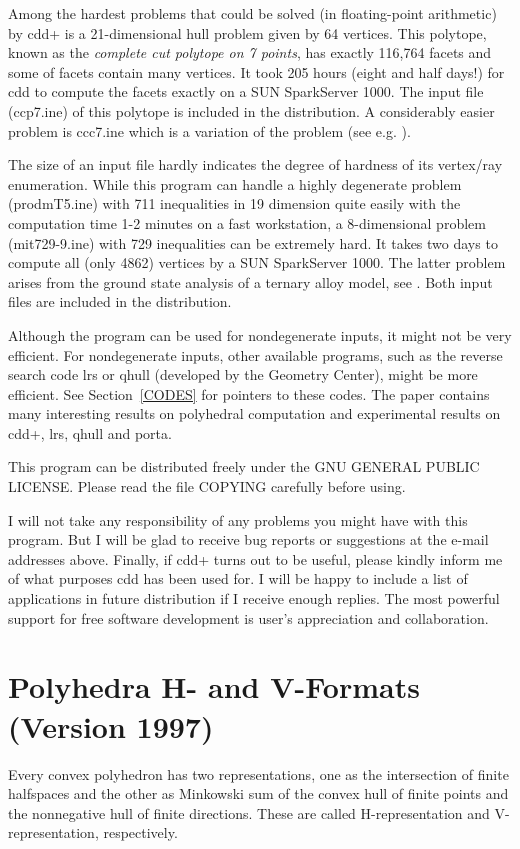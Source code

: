 \documentclass[11pt]{article}
\begin{document}
Among the hardest problems that could be
solved (in floating-point arithmetic) by cdd+ is a 
21-dimensional hull problem given by 64 
vertices. This polytope, known as the {\em complete
cut polytope on 7 points\/}, has exactly 116,764 facets
and some of facets contain many vertices. 
It took 205 hours (eight and half days!) for cdd
to compute the facets exactly on a SUN SparkServer 1000.
The input file (ccp7.ine) of this polytope is
included in the distribution.  A considerably easier
problem is ccc7.ine which is a variation of the problem 
(see e.g. \cite{g-afccn-90}).

The size of an input file hardly indicates the degree of 
hardness of its vertex/ray enumeration.  While this program
can handle a highly degenerate problem (prodmT5.ine) with 
711 inequalities in  19 dimension quite easily with
the computation time 1-2 minutes on a fast workstation, 
a 8-dimensional problem (mit729-9.ine) with 729 inequalities
can be extremely hard.  It takes two days to compute all
(only 4862) vertices by a SUN SparkServer 1000.  The latter problem arises
from the ground state analysis of a ternary alloy model, see \cite{cgaf-gstfl-94}.
Both input files are included in the distribution.  

Although the program can be used for nondegenerate inputs,
it might not be very efficient.  For nondegenerate inputs, 
other available programs, such as the reverse search code lrs or
qhull (developed by the Geometry Center),
might be more efficient.  See Section~\ref{CODES} 
for pointers to these codes.  
The paper \cite{abs-hgach-97} contains many interesting results on polyhedral
computation and experimental results on cdd+, lrs, qhull and porta.

This program can be distributed freely under the GNU GENERAL PUBLIC LICENSE.
Please read the file COPYING carefully before using.

I will not take any responsibility of any problems you might have
with this program.  But I will be glad to receive bug reports or suggestions
at the e-mail addresses above.  Finally, if cdd+ turns out to be useful, 
please kindly inform  me of  what purposes cdd has been used for. 
I will be happy to include a list of applications in future
distribution  if I receive  enough replies.
The most powerful support for free software development
is user's appreciation and collaboration.

\section{Polyhedra H- and V-Formats (Version 1997)} \label{FORMAT}
\bigskip
Every convex polyhedron has two representations, one as
the intersection of finite halfspaces and the other
as Minkowski sum of the convex hull of finite points
and the nonnegative hull of finite directions.  These are
called H-representation and V-representation, respectively.
\end{document}
